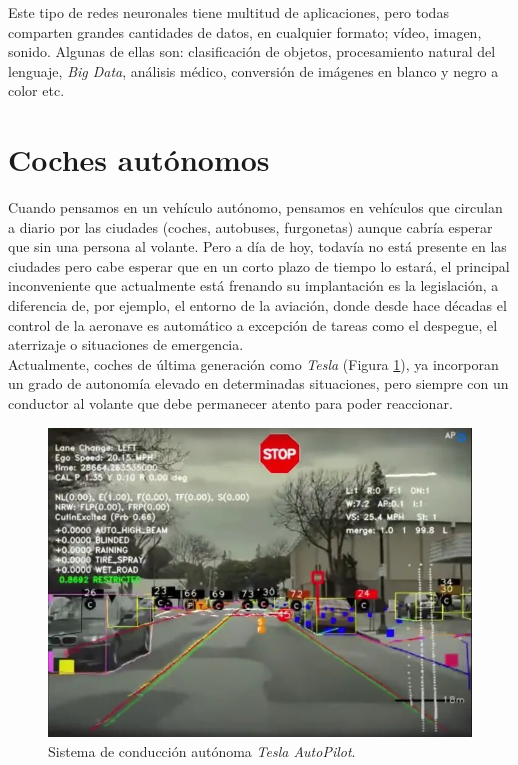 Este tipo de redes neuronales tiene multitud de aplicaciones, pero todas comparten grandes cantidades de datos, en cualquier formato; vídeo, imagen, sonido. Algunas de ellas son: clasificación de objetos, procesamiento natural del lenguaje, \textit{Big Data}, análisis médico, conversión de imágenes en blanco y negro a color etc.\\

\section{Coches autónomos}
\label{sec:cochesautonomos}
Cuando pensamos en un vehículo autónomo, pensamos en vehículos que circulan a diario por las ciudades (coches, autobuses, furgonetas) aunque cabría esperar que sin una persona al volante. Pero a día de hoy, todavía no está presente en las ciudades pero cabe esperar que en un corto plazo de tiempo lo estará, el principal inconveniente que actualmente está frenando su implantación es la legislación, a diferencia de, por ejemplo, el entorno de la aviación, donde desde hace décadas el control de la aeronave es automático a excepción de tareas como el despegue, el aterrizaje o situaciones de emergencia.\\

Actualmente, coches de última generación como \textit{Tesla} (Figura \ref{fig:teslaobjectdetection}), ya incorporan un grado de autonomía elevado en determinadas situaciones, pero siempre con un conductor al volante que debe permanecer atento para poder reaccionar.\\

\begin{figure} [h!]
	\begin{center}
		\includegraphics[width=12cm]{figs/teslaobjectdetection}
	\end{center}
	\caption{Sistema de conducción autónoma \textit{Tesla AutoPilot}.}
	\label{fig:teslaobjectdetection}
\end{figure}\

